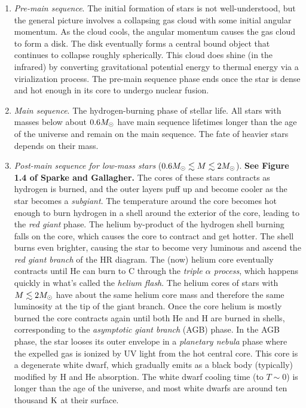 \documentclass[12pt]{article}
\begin{document}
\begin{enumerate}

\item {\it Pre-main sequence}. The initial formation of stars is not well-understood, but
the general picture involves a collapsing gas cloud with some initial angular momentum. As
the cloud cools, the angular momentum causes the gas cloud to form a disk. The disk eventually
forms a central bound object that continues to collapse roughly spherically.  This cloud does
shine (in the infrared) by converting gravitational potential energy to thermal energy via a
virialization process. The pre-main sequence phase ends once the star is dense and hot enough in
its core to undergo nuclear fusion.

\item {\it Main sequence}. The hydrogen-burning phase of stellar life. All stars with masses
below about $0.6M_{\odot}$ have main sequence lifetimes longer than the age of the universe and
remain on the main sequence.  The fate of heavier stars depends on their mass.

\item {\it Post-main sequence for low-mass stars} ($0.6M_{\odot}\lesssim M\lesssim 2M_{\odot}$).
{\bf See Figure 1.4 of Sparke and Gallagher.} 
The cores of these stars contracts as hydrogen is burned, and the outer layers puff up and
become cooler as the star becomes a {\it subgiant}. The temperature around the core
becomes hot enough to burn hydrogen in a shell around the exterior of the core, leading to
the {\it red giant} phase. The helium by-product of the hydrogen shell burning falls on the
core, which causes the core to contract and get hotter. The shell burns even brighter, causing
the star to become very luminous and ascend the {\it red giant branch} of the HR diagram.
The (now) helium core eventually contracts until He can burn to C through the
{\it triple $\alpha$ process}, which happens quickly in what's called the {\it helium flash}.
The helium cores of stars with $M\lesssim 2M_{\odot}$ have about the same helium core mass
and therefore the same luminosity at the tip of the giant branch. Once the core helium is mostly
burned the core contracts again until both He and H are burned in shells, corresponding to the
{\it asymptotic giant branch} (AGB) phase. In the AGB phase, the star looses its outer envelope
in a {\it planetary nebula} phase where the expelled gas is ionized by UV light from the hot
central core. This core is a degenerate white dwarf, which gradually emits as a black body (typically)
modified by H and He absorption. The white dwarf cooling time (to $T\sim0$) is longer than the age
of the universe, and most white dwarfs are around ten thousand $\mathrm{K}$ at their surface.


\end{enumerate}
\end{document}
